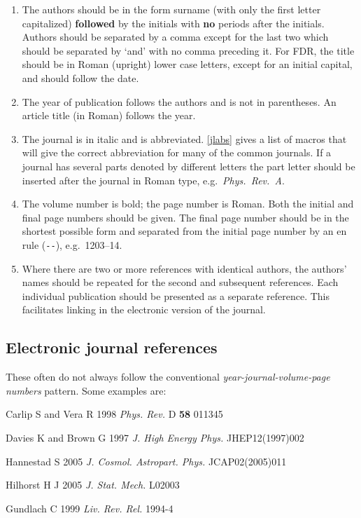\documentclass[12pt]{iopart}
\begin{document}
\begin{enumerate}
\item The authors should be in the form surname (with only the first 
letter capitalized) {\bf followed} by the initials with {\bf no} 
periods after the initials. Authors should be separated by a comma 
except for the last two which should be separated by `and' with no 
comma preceding it. For FDR,  the title should be in Roman (upright)
lower case letters, except for an initial 
capital, and should follow the date.

\item The year of publication follows the authors and is not in parentheses. An article title (in Roman) follows the year.

\item The journal is in italic and is abbreviated. \ref{jlabs} 
gives a list of macros that will give the correct abbreviation for 
many of the common journals. If a journal has several parts denoted by 
different letters the part letter should be inserted after the journal in Roman type, e.g.\ 
{\it Phys.\ Rev.\ \rm A}. 

\item The volume number is bold; the page number is Roman.
 Both the initial and final page numbers should be given. The final page number should be in 
the shortest possible form and separated from the initial page number by an en rule (\verb"--"), e.g.\ 1203--14.

\item Where there are two or more references with identical authors, 
the authors' names should be repeated for the second and subsequent references. Each individual publication should be presented as a separate reference. This facilitates linking in the electronic version of the journal. 
\end{enumerate}
\subsection{Electronic journal references}
These often do not always follow the conventional {\it year-journal-volume-page numbers} pattern. Some examples are:

\item Carlip S and Vera R 1998 {\it Phys. Rev.} D {\bf 58} 011345 
\item Davies K and Brown G 1997 {\it J. High Energy Phys.} JHEP12(1997)002
\item Hannestad S 2005 {\it J. Cosmol. Astropart. Phys.} JCAP02(2005)011
\item Hilhorst H J 2005 {\it J. Stat. Mech.} L02003
\item Gundlach C 1999 {\it Liv. Rev. Rel.} 1994-4
\endnumrefs
\end{document}
